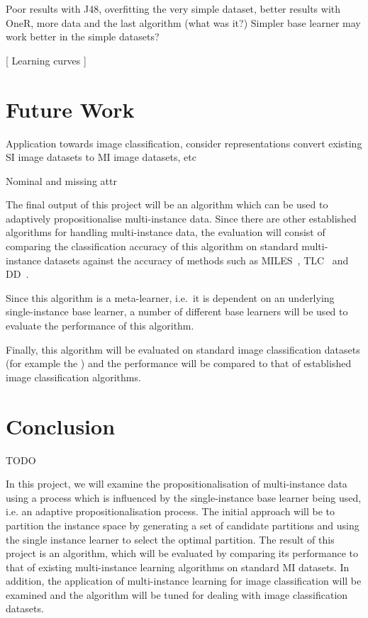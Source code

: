\documentclass[a4paper,12pt]{article} %
\begin{document}
Poor results with J48, overfitting the very simple dataset, better results with 
    OneR, more data and the last algorithm (what was it?)
Simpler base learner may work better in the simple datasets?

[ Learning curves ]


\section{Future Work}
Application towards image classification, consider representations
    convert existing SI image datasets to MI image datasets, etc

Nominal and missing attr

The final output of this project will be an algorithm which can be used to adaptively propositionalise multi-instance data. Since there are other established algorithms for handling multi-instance data, the evaluation will consist of comparing the classification accuracy of this algorithm on standard multi-instance datasets against the accuracy of methods such as MILES~\cite{Chen2006}, TLC~\cite{Weidmann2003} and DD~\cite{Maron98mil}.

Since this algorithm is a meta-learner, i.e.\ it is dependent on an underlying single-instance base learner, a number of different base learners will be used to evaluate the performance of this algorithm.
 
Finally, this algorithm will be evaluated on standard image classification datasets (for example the ) and the performance will be compared to that of established image classification algorithms.


\section{Conclusion}
TODO

In this project, we will examine the propositionalisation of multi-instance data using a process which is influenced by the single-instance base learner being used, i.e. an adaptive propositionalisation process. The initial approach will be to partition the instance space by generating a set of candidate partitions and using the single instance learner to select the optimal partition. 
The result of this project is an algorithm, which will be evaluated by comparing its performance to that of existing multi-instance learning algorithms on standard MI datasets. 
In addition, the application of multi-instance learning for image classification will be examined and the algorithm will be tuned for dealing with image classification datasets.
\clearpage
 

\end{document}

